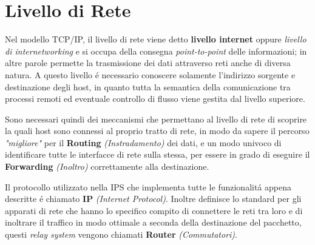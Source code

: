 \documentclass[12pt]{article}
\begin{document}
\date{}
\title{\vspace{-11ex}} %
 
\maketitle

\section{Livello di Rete}\label{livello-di-rete}
Nel modello TCP/IP, il livello di rete viene detto \textbf{livello internet} oppure \textit{livello di internetworking} 
e si occupa della consegna \textit{point-to-point} delle informazioni; in altre parole permette la trasmissione dei dati 
attraverso reti anche di diversa natura. A questo livello \'e necessario conoscere solamente l'indirizzo 
sorgente e destinazione degli host, in quanto tutta la semantica della comunicazione tra processi remoti ed eventuale 
controllo di flusso viene gestita dal livello superiore.

Sono necessari quindi dei meccanismi che permettano al livello di rete di scoprire la quali host sono connessi al 
proprio tratto di rete, in modo da sapere il percorso \textit{"migliore"} per il \textbf{Routing} 
\textit{(Instradamento)} dei dati, e un modo univoco di identificare tutte le interfacce di rete sulla stessa, per 
essere in grado di eseguire il \textbf{Forwarding} \textit{(Inoltro)} correttamente alla destinazione.

Il protocollo utilizzato nella IPS che implementa tutte le funzionalit\'a appena descritte \'e chiamato \textbf{IP} 
\textit{(Internet Protocol)}. Inoltre definisce lo standard per gli apparati di rete che hanno lo specifico compito di 
connettere le reti tra loro e di inoltrare il traffico in modo ottimale a seconda della destinazione del pacchetto, 
questi \textit{relay system} vengono chiamati \textbf{Router} \textit{(Commutatori)}.
\end{document}
